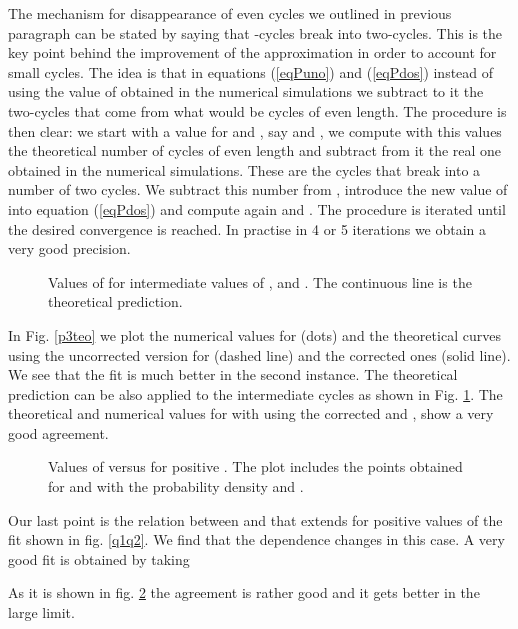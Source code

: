 \documentclass[]{iopart}
\begin{document}
The mechanism for disappearance of even cycles we
outlined in previous paragraph can be stated by saying that
-cycles break into  two-cycles. This is the key point
behind the improvement of the approximation  
in order to account for small cycles.
The idea is that in equations (\ref{eqPuno}) 
and (\ref{eqPdos}) instead of using the value of 
obtained in the numerical simulations we subtract to it
the two-cycles that come from what would be cycles of even length.
The procedure is then clear: we start with a value for  and ,
say  and , we compute with this values the theoretical
number of cycles of even length and subtract from it the real one
obtained in the numerical simulations. These are the cycles that break
into a number of two cycles. We subtract this number from , 
introduce the new value of  into equation (\ref{eqPdos})
and compute again  and . The procedure is iterated until the
desired convergence is reached. In practise in 4 or 5 iterations we obtain
a very good precision.

\begin{figure}[h!]
\caption{\small Values of  for intermediate values of ,
  and . The continuous line is the theoretical prediction. }
\label{kpkteo}
\end{figure}


In Fig. \ref{p3teo} we plot the numerical values for 
(dots) and  the theoretical curves using the uncorrected version 
for  (dashed line) 
and the corrected ones (solid line). 
We see that the fit is much better in the second instance. 
The theoretical prediction can be also applied to 
the intermediate cycles as shown in Fig. \ref{kpkteo}.
The theoretical 
and numerical values for  with 
using the corrected  and , show a very good 
agreement.

\begin{figure}[h!]
\caption{\small Values of  versus  for positive  
. The plot includes the points obtained for 
  and with the probability density   and . }
\label{q1q2+}
\end{figure}


Our last point is the relation between  and  that 
extends for positive values of  the fit shown in
fig. \ref{q1q2}.
We find that the dependence changes in this case. 
A very good fit is obtained by taking 

 As it is shown in fig. \ref{q1q2+} the agreement is rather good and 
it gets better in the large  limit.
 
\end{document}
